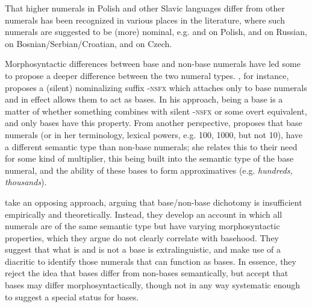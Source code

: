 \documentclass[output=paper]{langscibook}
\begin{document}
\noindent That higher numerals in Polish and other Slavic languages differ from other numerals has been recognized in various places in the literature, where such numerals are suggested to be (more) nominal, e.g. \citet{rutkowski2002} and \citet{miechowicz2014hist} on Polish, \citet{neidle1988role} and \citet{franks1995slavic} on Russian, \citet{giusti2005categorial} on Bosnian/Serbian/Croatian, and \citet{veselovska2001agreement} on Czech.

Morphosyntactic differences between base and non-base numerals have led some to propose a deeper difference between the two numeral types. \citet{kayne2005bases}, for instance, proposes a (silent) nominalizing suffix \textsc{-nsfx} which attaches only to base numerals and in effect allows them to act as bases. In his approach, being a base is a matter of whether something combines with silent \textsc{-nsfx} or some overt equivalent, and only bases have this property.
From another perspective, \citet{rothstein2013fregean} proposes that base numerals (or in her terminology, lexical powers, e.g. 100, 1000, but not 10), have a different semantic type than non-base numerals; she relates this to their need for some kind of multiplier, this being built into the semantic type of the base numeral, and the ability of these bases to form approximatives (e.g. \textit{hundreds, thousands}).

\citet{ionin_matushansky2018cardinals} take an opposing approach, arguing that  base/non-base dichotomy is insufficient empirically and theoretically. Instead, they develop an account in which all numerals are of the same semantic type but have varying morphosyntactic properties, which they argue do not clearly correlate with basehood. They suggest that what is and is not a base is extralinguistic, and make use of a diacritic to identify those numerals that can function as bases. In essence, they reject the idea that bases differ from non-bases semantically, but accept that bases may differ morphosyntactically, though not in any way systematic enough to suggest a special status for bases.
\end{document}
